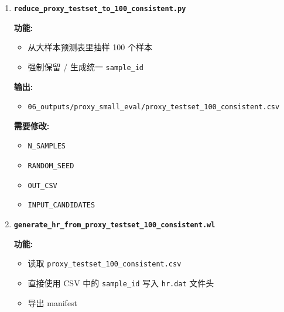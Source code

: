\documentclass[lang=cn,scheme=chinese,color=blue,device=normal,toc=onecol,math=cm]{elegantbook}
\begin{document}
\begin{enumerate}
\item \textbf{\texttt{reduce\_\allowbreak{}proxy\_\allowbreak{}testset\_\allowbreak{}to\_\allowbreak{}100\_\allowbreak{}consistent.py}}\par
 
\textbf{功能:}\par
 
\begin{itemize}
\item 从大样本预测表里抽样 100 个样本
\item 强制保留 /\allowbreak{} 生成统一 \texttt{sample\_\allowbreak{}id}
\end{itemize}
 
\textbf{输出:}\par
 
\begin{itemize}
\item \texttt{06\_\allowbreak{}outputs/\allowbreak{}proxy\_\allowbreak{}small\_\allowbreak{}eval/\allowbreak{}proxy\_\allowbreak{}testset\_\allowbreak{}100\_\allowbreak{}consistent.csv}
\end{itemize}
 
\textbf{需要修改:}\par
 
\begin{itemize}
\item \texttt{N\_\allowbreak{}SAMPLES}
\item \texttt{RANDOM\_\allowbreak{}SEED}
\item \texttt{OUT\_\allowbreak{}CSV}
\item \texttt{INPUT\_\allowbreak{}CANDIDATES}
\end{itemize}
\item \textbf{\texttt{generate\_\allowbreak{}hr\_\allowbreak{}from\_\allowbreak{}proxy\_\allowbreak{}testset\_\allowbreak{}100\_\allowbreak{}consistent.wl}}\par
 
\textbf{功能:}\par
 
\begin{itemize}
\item 读取 \texttt{proxy\_\allowbreak{}testset\_\allowbreak{}100\_\allowbreak{}consistent.csv}
\item 直接使用 CSV 中的 \texttt{sample\_\allowbreak{}id} 写入 \texttt{hr.dat} 文件头
\item 导出 manifest
\end{itemize}
 

\end{enumerate}
\end{document}
